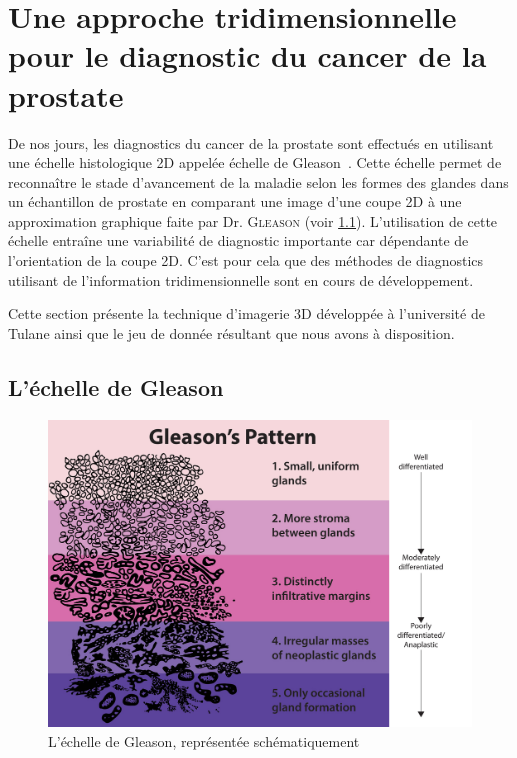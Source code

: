 \chapter{Une approche tridimensionnelle pour le diagnostic du cancer de la prostate}\label{chapter:02:presentation_probleme}
{
	
	De nos jours, les diagnostics du cancer de la prostate sont effectués en utilisant une échelle histologique 2D appelée échelle de Gleason~\cite{cite_gleason_score}. Cette échelle permet de reconnaître le stade d'avancement de la maladie selon les formes des glandes dans un échantillon de prostate en  comparant une image d'une coupe 2D à une approximation graphique faite par Dr. \textsc{Gleason} (voir \ref{section:gleason_scale}). L'utilisation de cette échelle %
	entraîne une variabilité de diagnostic importante car dépendante de l'orientation de la coupe 2D. C'est pour cela que des méthodes de diagnostics utilisant de l'information tridimensionnelle sont en cours de développement.
	
	Cette section présente la technique d'imagerie 3D développée à l'université de Tulane ainsi que le jeu de donnée résultant que nous avons à disposition.
	
	\section{L'\'echelle de Gleason}\label{section:gleason_scale}
	{
		\begin{figure}[!h]
		    \centering
		    \includegraphics[width=.7\linewidth]{img/gleason_score.jpg}
		    \captionsetup{width=.8\linewidth}
		    \caption{L'échelle de Gleason, représentée schématiquement}
		    \label{img:gleason_scale}
		\end{figure}

}}
